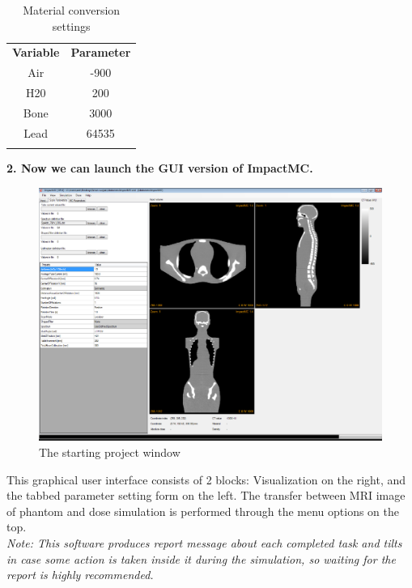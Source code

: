 \documentclass[fleqn,10pt]{SelfArx} %
\begin{document}
\begin{table}[!hbt]
\caption{Material conversion settings}
\centering

   \label{tab:label}
   \begin{tabulary}{\linewidth}[hbt]{||c|c||}
   \textbf{Variable} & \textbf{Parameter}\\
  \hhline{|:=|=:|}
    Air &  -900\\
	\hhline{||--||}
   H20 & 200\\
	\hhline{||--||}
  Bone & 3000\\
	\hhline{||--||}
  Lead & 64535\\
  \end{tabulary}
\end{table}


\textbf{2. Now we can launch the GUI version of ImpactMC. }

\begin{figure}[ht]\centering
\includegraphics[width=\linewidth]{startingImage}
\caption{The starting project window}
\label{fig:startingImage}
\end{figure}
This graphical user interface consists of 2 blocks: Visualization on the right, and the tabbed parameter setting form on the left. The transfer between MRI image of phantom and dose simulation is performed through the menu options on the top.\\
 \textit{Note: This software produces report message about each completed task and tilts in case some action is taken inside it during the simulation, so waiting for the report is highly recommended.}
\end{document}
